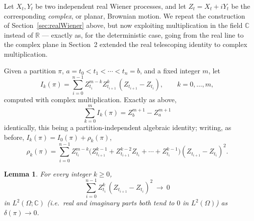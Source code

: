 \documentclass[11pt,fleqn]{article}
\def\C{\mathbb C}
\def\R{\mathbb R}
\theoremstyle{plain}
\newtheorem{lemma}[thm]{Lemma}
\theoremstyle{remark}
\begin{document}
Let $X_t,Y_t$ be two independent real Wiener processes, and let
$Z_t=X_t+iY_t$ be the corresponding \emph{complex}, or planar, Brownian
motion. We repeat the construction of Section~\ref{sec:realWiener} above,
but now exploiting multiplication in the field $\C$ instead of $\R$ —
exactly as, for the deterministic case, going from the real line to the
complex plane in Section~2 extended the real telescoping identity to
complex multiplication.

Given a partition $\pi$, $a=t_0<t_1<\cdots<t_n=b$, and a fixed integer
$m$, let
\[
I_k(\pi)=\sum_{i=0}^{n-1} Z_{t_i}^{m-k}Z_{t_{i+1}}^k\,(Z_{t_{i+1}}-Z_{t_i}),
\qquad k=0,\ldots,m,
\]
computed with complex multiplication. Exactly as above,
\[
\sum_{k=0}^m I_k(\pi)=Z_b^{m+1}-Z_a^{m+1}
\]
identically, this being a partition-independent algebraic identity;
writing, as before, $I_k(\pi)=I_0(\pi)+\rho_k(\pi)$,
\[
\rho_k(\pi)=\sum_{i=0}^{n-1} Z_{t_i}^{m-k}\big(Z_{t_{i+1}}^{k-1}+
Z_{t_{i+1}}^{k-2}Z_{t_i}+\cdots+Z_{t_i}^{k-1}\big)(Z_{t_{i+1}}-Z_{t_i})^2.
\]

\begin{lemma}\label{lem:l3}
For every integer $k\ge0$,
\[
\sum_{i=0}^{n-1} Z_{t_i}^k\,(Z_{t_{i+1}}-Z_{t_i})^2\ \to\ 0
\]
in $L^2(\Omega;\C)$ (i.e.\ real and imaginary parts both tend to $0$ in
$L^2(\Omega)$) as $\delta(\pi)\to0$.
\end{lemma}
\end{document}

